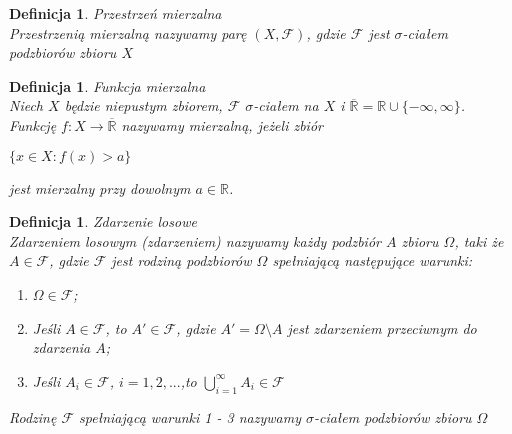 \documentclass[12pt,a4paper]{report}
\newtheorem{definition}[theorem]{Definicja}
\begin{document}
\begin{definition}{Przestrzeń mierzalna \cite[Rozdział 2.10]{billingsley1987}\\}
Przestrzenią mierzalną nazywamy parę $(X, \mathcal{F})$, gdzie $\mathcal{F}$ jest $\sigma$-ciałem podzbiorów zbioru $X$\\
\end{definition}

\begin{definition}{Funkcja mierzalna \cite[w oparciu o rozdział 8.2]{rudnicki2006}\\}
Niech $X$ będzie niepustym zbiorem, $\mathcal{F}$  $\sigma$-ciałem na $X$ i $\overline{\mathbb{R}} = \mathbb{R} \cup \{-\infty, \infty \}$. Funkcję $f: X \rightarrow \overline{\mathbb{R}}$ nazywamy mierzalną, jeżeli zbiór
\begin{center}
$\{ x \in X: f(x) > a \}$
\end{center}
jest mierzalny przy dowolnym $a \in \mathbb{R}$.\\
\end{definition}

\begin{definition}{Zdarzenie losowe \cite[w oparciu o rozdział 1.1]{krysicki1999}\\}
Zdarzeniem losowym (zdarzeniem) nazywamy każdy podzbiór $\textit{A}$ zbioru $\Omega$, taki że  $A \in \mathcal{F}$, gdzie $\mathcal{F}$ jest rodziną podzbiorów $\Omega$ spełniającą następujące warunki:
\begin{enumerate}
\item $\Omega \in \mathcal{F}$;
\item Jeśli $A \in \mathcal{F}$, to $\textit{A$'$} \in \mathcal{F}$, gdzie $\textit{A$'$} = \Omega \setminus A $ jest zdarzeniem przeciwnym do zdarzenia $\textit{A}$;
\item Jeśli $\textit{A}_{i} \in \mathcal{F}$, $i= 1, 2, ...$,to $\bigcup\limits_{i=1}^{\infty} A_{i} \in \mathcal{F} $
\end{enumerate}
Rodzinę $\mathcal{F}$ spełniającą warunki 1 - 3 nazywamy $\sigma$-ciałem podzbiorów zbioru $\Omega$\\
\end{definition}
\end{document}
